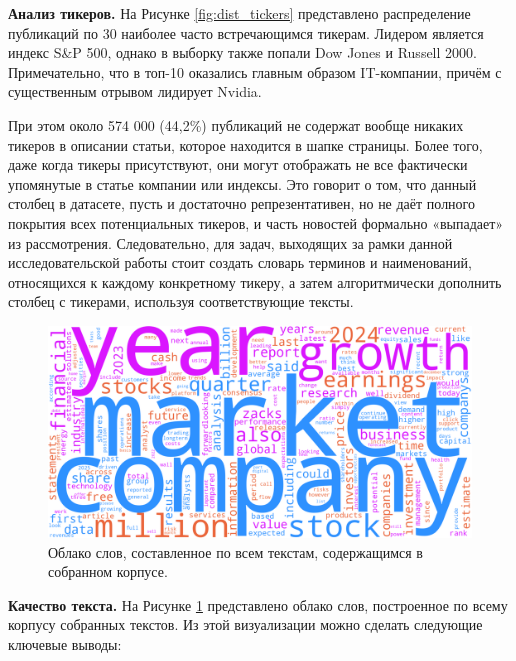 \textbf{Анализ тикеров.} На Рисунке \ref{fig:dist_tickers} представлено распределение публикаций по 30 наиболее часто встречающимся
тикерам. Лидером является индекс S\&P 500, однако в выборку также попали Dow Jones и Russell 2000. Примечательно, что в топ-10
оказались главным образом IT-компании, причём с существенным отрывом лидирует Nvidia.

При этом около 574 000 (44,2\%) публикаций не содержат вообще никаких тикеров в описании статьи, которое находится
в шапке страницы. Более того, даже когда тикеры присутствуют, они могут отображать не все фактически упомянутые
в статье компании или индексы. Это говорит о том, что данный столбец в датасете, пусть и достаточно репрезентативен,
но не даёт полного покрытия всех потенциальных тикеров, и часть новостей формально «выпадает» из рассмотрения.
Следовательно, для задач, выходящих за рамки данной исследовательской работы стоит создать словарь терминов и наименований,
относящихся к каждому конкретному тикеру, а затем алгоритмически дополнить столбец с тикерами, используя соответствующие тексты.

\begin{figure}[H]
    \centering
    \includegraphics[width=1\linewidth]{img/wordcloud.png}
    \caption{\label{fig:wordcloud}Облако слов, составленное по всем текстам, содержащимся в собранном корпусе.}
\end{figure}

\textbf{Качество текста.} На Рисунке \ref{fig:wordcloud} представлено облако слов, построенное по всему
корпусу собранных текстов. Из этой визуализации можно сделать следующие ключевые выводы:

